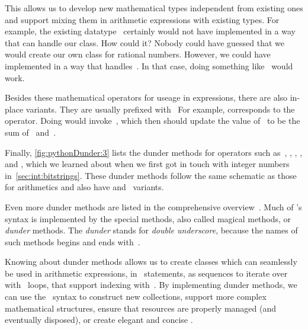 This allows us to develop new mathematical types independent from existing ones and support mixing them in arithmetic expressions with existing types.
For example, the existing datatype~ certainly would not have  implemented in a way that can handle our  class.
How could it?
Nobody could have guessed that we would create our own class for rational numbers.
However, we could have implemented  in a way that handles~.
In that case, doing something like~ would work.

Besides these mathematical operators for useage in expressions, there are also in-place variants.
They are usually prefixed with~
For example,  corresponds to the~\pythonil{+=} operator.
Doing  would invoke~, which then should update the value of~ to be the sum of~ and~.

Finally, \cref{fig:pythonDunder:3} lists the dunder methods for operators such as~\pythonilIdx{\&}, \pythonil{|}\pythonIdx{\textbar}, \pythonil{\^}\pythonIdx{\textasciicircum}, \pythonil{>>}\pythonIdx{>\strut>}, and \pythonil{<<}\pythonIdx{<\strut<}, which we learned about when we first got in touch with integer numbers in~\cref{sec:int:bitstrings}.
These dunder methods follow the same schematic as those for arithmetics and also have  and ~variants.

Even more dunder methods are listed in the comprehensive overview~\cite{H2025PM:EDMIP}.
%
\endhsection%
%
%
Much of \python's syntax is implemented by the special methods, also called magical methods, or \emph{dunder} methods.
The \emph{dunder} stands for \emph{double underscore}, because the names of such methods begins and ends with~\pythonilIdx{\_\_}.

Knowing about dunder methods allows us to create classes which can seamlessly be used in arithmetic expressions, in ~statements, as sequences to iterate over with ~loops, that support indexing with~\pythonil{[...]}\pythonIdx{[\idxdots]}.
By implementing dunder methods, we can use the \python\ syntax to construct new collections, support more complex mathematical structures, ensure that resources are properly managed (and eventually disposed), or create elegant and concise .%
\endhsection%
%
\FloatBarrier%
\endhsection%
